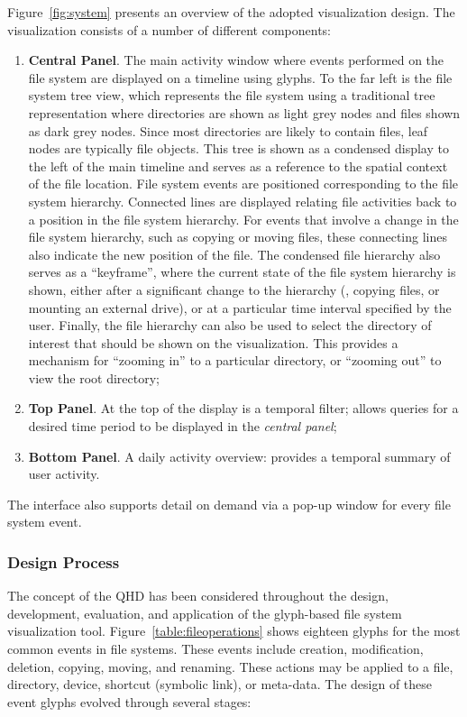 Figure~\ref{fig:system} presents an overview of the adopted visualization design.
The visualization consists of a number of different components:
\begin{enumerate}
\item \textbf{Central Panel}. The main activity window where events performed on the file system are displayed on a timeline using glyphs. 
To the far left is the file system tree view, which represents the file system using a traditional tree representation where directories are shown as light grey nodes and files shown as dark grey nodes.
Since most directories are likely to contain files, leaf nodes are typically file objects.
This tree is shown as a condensed display to the left of the main timeline and serves as a reference to the spatial context of the file location.
File system events are positioned corresponding to the file system hierarchy.
Connected lines are displayed relating file activities back to a position in the file system hierarchy.
For events that involve a change in the file system hierarchy, such as copying or moving files, these connecting lines also indicate the new position of the file.
The condensed file hierarchy also serves as a ``keyframe'', where the current state of the file system hierarchy is shown, either after a significant change to the hierarchy (\eg, copying files, or mounting an external drive), or at a particular time interval specified by the user.
Finally, the file hierarchy can also be used to select the directory of interest that should be shown on the visualization.
This provides a mechanism for ``zooming in'' to a particular directory, or ``zooming out'' to view the root directory;

\item \textbf{Top Panel}. At the top of the display is a temporal filter; allows queries for a desired time period to be displayed in the \emph{central panel};

\item \textbf{Bottom Panel}. A daily activity overview: provides a temporal summary of user activity.
\end{enumerate}

The interface also supports detail on demand via a pop-up window for every file system event. 

\subsubsection{Design Process}

The concept of the QHD has been considered throughout the design, development, evaluation, and application of the glyph-based file system visualization tool.
Figure~\ref{table:fileoperations} shows eighteen glyphs for the most common events in file systems.
These events include creation, modification, deletion, copying, moving, and renaming.
These actions may be applied to a file, directory, device, shortcut (symbolic link), or meta-data.
The design of these event glyphs evolved through several stages:

